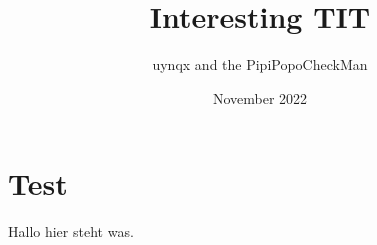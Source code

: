 \documentclass[parskip=full]{scrartcl}
\title{Interesting TIT}
\author{uynqx and the PipiPopoCheckMan}
\date{November 2022}
\begin{document}
\maketitle

\section{Test}
Hallo hier steht was.
\end{document}
